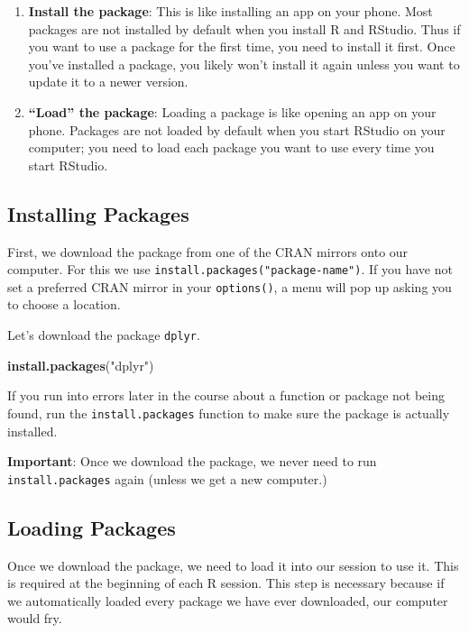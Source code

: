 \documentclass[]{book}
\newenvironment{Shaded}{\begin{snugshade}}{\end{snugshade}}
\newcommand{\KeywordTok}[1]{\textcolor[rgb]{0.13,0.29,0.53}{\textbf{#1}}}
\newcommand{\StringTok}[1]{\textcolor[rgb]{0.31,0.60,0.02}{#1}}
\newcommand{\NormalTok}[1]{#1}
\providecommand{\tightlist}{%
  \setlength{\itemsep}{0pt}\setlength{\parskip}{0pt}}
\begin{document}
\begin{enumerate}
\def\labelenumi{\arabic{enumi}.}
\tightlist
\item
  \textbf{Install the package}: This is like installing an app on your
  phone. Most packages are not installed by default when you install R
  and RStudio. Thus if you want to use a package for the first time, you
  need to install it first. Once you've installed a package, you likely
  won't install it again unless you want to update it to a newer
  version.
\item
  \textbf{``Load'' the package}: Loading a package is like opening an
  app on your phone. Packages are not loaded by default when you start
  RStudio on your computer; you need to load each package you want to
  use every time you start RStudio.
\end{enumerate}

\subsection{Installing Packages}\label{installing-packages}

First, we download the package from one of the CRAN mirrors onto our
computer. For this we use \texttt{install.packages("package-name")}. If
you have not set a preferred CRAN mirror in your \texttt{options()}, a
menu will pop up asking you to choose a location.

Let's download the package \texttt{dplyr}.

\begin{Shaded}
\begin{Highlighting}[]
\KeywordTok{install.packages}\NormalTok{(}\StringTok{"dplyr"}\NormalTok{)}
\end{Highlighting}
\end{Shaded}

If you run into errors later in the course about a function or package
not being found, run the \texttt{install.packages} function to make sure
the package is actually installed.

\textbf{Important}: Once we download the package, we never need to run
\texttt{install.packages} again (unless we get a new computer.)

\subsection{Loading Packages}\label{loading-packages}

Once we download the package, we need to load it into our session to use
it. This is required at the beginning of each R session. This step is
necessary because if we automatically loaded every package we have ever
downloaded, our computer would fry.
\end{document}

